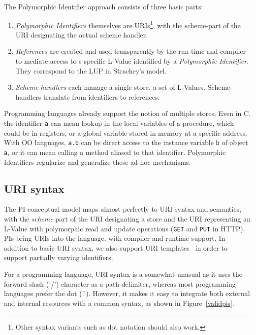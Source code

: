\documentclass[preprint]{sigplanconf}
\begin{document}
The Polymorphic Identifier approach consists of three basic parts:
\begin{enumerate}
\item \emph{Polymorphic Identifiers} themselves are URIs\footnote{Other syntax variants such as dot notation should also work.}, with the scheme-part of the URI designating the actual scheme handler.
	
\item \emph{References} are created and used transparently by the run-time and compiler
	to mediate access to s specific L-Value identified by a \emph{Polymorphic Identifier}.
	They correspond to the LUP in Strachey's model.  

\item \emph{Scheme-handlers} each manage a single store, a set of L-Values.  Scheme-handlers 
	translate from identifiers to references.
	
	
\end{enumerate}

Programming languages already support the notion of multiple stores.  Even in C, the identifier {\tt a}
can mean lookup in the local variables of a procedure, which could be in registers, or a global
variable stored in memory at a specific address.  With OO languages, {\tt a.b} can be direct
access to the instance variable {\tt b} of object {\tt a}, or it can mean calling a method aliased
to that identifier.  Polymorphic Identifiers regularize and generalize these ad-hoc mechanisms.

\subsection{URI syntax}



The PI conceptual model maps almost perfectly to URI syntax and semantics, with the \emph{scheme}
part of the URI designating a store and the URI representing an L-Value with polymorphic read
and update operations ({\tt GET} and {\tt PUT} in HTTP).  PIs bring URIs into the language, with
compiler and runtime support.  In addition to basic URI syntax, we also support URI templates~\cite{rfc6570}
in order to support partially varying identifiers.

For a programming language, URI syntax is a somewhat unusual as it uses the forward slash ('/')
character as a path delimiter, whereas most programming languages prefer the dot ('.').  However,
it makes it easy to integrate both external and internal resources with a common syntax, as shown 
in Figure~\ref{validpis}.  
\end{document}
